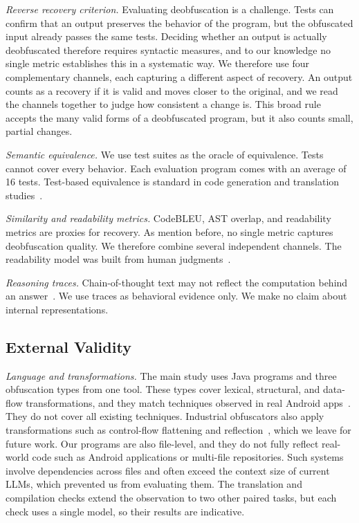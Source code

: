 \textit{Reverse recovery criterion.}
Evaluating deobfuscation is a challenge.
Tests can confirm that an output preserves the behavior of the program, but the obfuscated input already passes the same tests.
Deciding whether an output is actually deobfuscated therefore requires syntactic measures, and to our knowledge no single metric establishes this in a systematic way.
We therefore use four complementary channels, each capturing a different aspect of recovery.
An output counts as a recovery if it is valid and moves closer to the original, and we read the channels together to judge how consistent a change is.
This broad rule accepts the many valid forms of a deobfuscated program, but it also counts small, partial changes.

\textit{Semantic equivalence.}
We use test suites as the oracle of equivalence.
Tests cannot cover every behavior.
Each evaluation program comes with an average of 16 tests.
Test-based equivalence is standard in code generation and translation studies~\cite{pan2024lost}.

\textit{Similarity and readability metrics.}
CodeBLEU, AST overlap, and readability metrics are proxies for recovery.
As mention before, no single metric captures deobfuscation quality.
We therefore combine several independent channels.
The readability model was built from human judgments~\cite{scalabrino2018readability}. 

\textit{Reasoning traces.}
Chain-of-thought text may not reflect the computation behind an answer~\cite{turpin2023unfaithful,jacovi2020faithfulness}.
We use traces as behavioral evidence only.
We make no claim about internal representations.

\subsection{External Validity}

\textit{Language and transformations.}
The main study uses Java programs and three obfuscation types from one tool.
These types cover lexical, structural, and data-flow transformations, and they match techniques observed in real Android apps~\cite{dong2018android, wermke2018obfuscation}.
They do not cover all existing techniques.
Industrial obfuscators also apply transformations such as control-flow flattening and reflection~\cite{dong2018android}, which we leave for future work.
Our programs are also file-level, and they do not fully reflect real-world code such as Android applications or multi-file repositories.
Such systems involve dependencies across files and often exceed the context size of current LLMs, which prevented us from evaluating them.
The translation and compilation checks extend the observation to two other paired tasks, but each check uses a single model, so their results are indicative.

